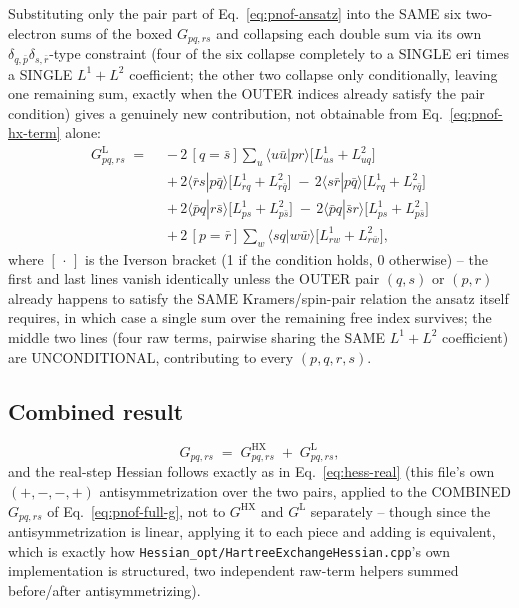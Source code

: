 \documentclass[11pt]{article}
\begin{document}
Substituting only the pair part of Eq.~\eqref{eq:pnof-ansatz} into the
SAME six two-electron sums of the boxed $G_{pq,rs}$ and collapsing each
double sum via its own $\delta_{q,\bar p}\delta_{s,\bar r}$-type
constraint (four of the six collapse completely to a SINGLE eri times a
SINGLE $L^1+L^2$ coefficient; the other two collapse only conditionally,
leaving one remaining sum, exactly when the OUTER indices already satisfy
the pair condition) gives a genuinely new contribution, not obtainable
from Eq.~\eqref{eq:pnof-hx-term} alone:
\begin{equation}
\begin{aligned}
G^{\mathrm{L}}_{pq,rs} \;=\;\;
& -\,2\,[q=\bar s]\sum_{u}\langle u\bar u|pr\rangle\Big[L^{1}_{us}+L^{2}_{uq}\Big] \\[4pt]
& +\,2\langle \bar r s|p\bar q\rangle\Big[L^{1}_{rq}+L^{2}_{r\bar q}\Big]
\;-\,2\langle s\bar r|p\bar q\rangle\Big[L^{1}_{rq}+L^{2}_{r\bar q}\Big] \\[4pt]
& +\,2\langle \bar p q|r\bar s\rangle\Big[L^{1}_{ps}+L^{2}_{p\bar s}\Big]
\;-\,2\langle \bar p q|\bar s r\rangle\Big[L^{1}_{ps}+L^{2}_{p\bar s}\Big] \\[4pt]
& +\,2\,[p=\bar r]\sum_{w}\langle sq|w\bar w\rangle\Big[L^{1}_{rw}+L^{2}_{r\bar w}\Big],
\end{aligned}
\label{eq:pnof-l1l2-term}
\end{equation}
where $[\,\cdot\,]$ is the Iverson bracket (1 if the condition holds, 0
otherwise) -- the first and last lines vanish identically unless the
OUTER pair $(q,s)$ or $(p,r)$ already happens to satisfy the SAME
Kramers/spin-pair relation the ansatz itself requires, in which case a
single sum over the remaining free index survives; the middle two lines
(four raw terms, pairwise sharing the SAME $L^1+L^2$ coefficient) are
UNCONDITIONAL, contributing to every $(p,q,r,s)$.

\subsection*{Combined result}

\begin{equation}
G_{pq,rs} \;=\; G^{\mathrm{HX}}_{pq,rs} \;+\; G^{\mathrm{L}}_{pq,rs},
\label{eq:pnof-full-g}
\end{equation}
and the real-step Hessian follows exactly as in Eq.~\eqref{eq:hess-real}
(this file's own $(+,-,-,+)$ antisymmetrization over the two pairs, applied
to the COMBINED $G_{pq,rs}$ of Eq.~\eqref{eq:pnof-full-g}, not to
$G^{\mathrm{HX}}$ and $G^{\mathrm{L}}$ separately -- though since the
antisymmetrization is linear, applying it to each piece and adding is
equivalent, which is exactly how \texttt{Hessian\_opt/HartreeExchangeHessian.cpp}'s
own implementation is structured, two independent raw-term helpers summed
before/after antisymmetrizing).
\end{document}
